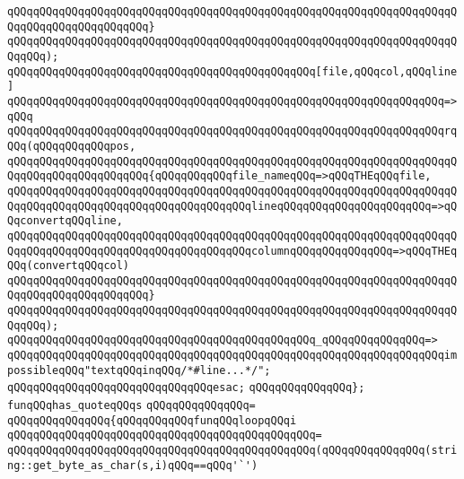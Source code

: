 \verb|qQQqqQQqqQQqqQQqqQQqqQQqqQQqqQQqqQQqqQQqqQQqqQQqqQQqqQQqqQQqqQQqqQQqqQQqqQQqqQQqqQQqqQQqqQQq}|\newline
\verb|qQQqqQQqqQQqqQQqqQQqqQQqqQQqqQQqqQQqqQQqqQQqqQQqqQQqqQQqqQQqqQQqqQQqqQQqqQQq);|\newline
\newline
\verb|qQQqqQQqqQQqqQQqqQQqqQQqqQQqqQQqqQQqqQQqqQQqqQQq[file,qQQqcol,qQQqline]|\newline
\verb|qQQqqQQqqQQqqQQqqQQqqQQqqQQqqQQqqQQqqQQqqQQqqQQqqQQqqQQqqQQqqQQqqQQq=>qQQq|\newline
\verb|qQQqqQQqqQQqqQQqqQQqqQQqqQQqqQQqqQQqqQQqqQQqqQQqqQQqqQQqqQQqqQQqqQQqrqQQq(qQQqqQQqqQQqpos,|\newline
\verb|qQQqqQQqqQQqqQQqqQQqqQQqqQQqqQQqqQQqqQQqqQQqqQQqqQQqqQQqqQQqqQQqqQQqqQQqqQQqqQQqqQQqqQQqqQQq{qQQqqQQqqQQqfile_nameqQQq=>qQQqTHEqQQqfile,|\newline
\verb|qQQqqQQqqQQqqQQqqQQqqQQqqQQqqQQqqQQqqQQqqQQqqQQqqQQqqQQqqQQqqQQqqQQqqQQqqQQqqQQqqQQqqQQqqQQqqQQqqQQqqQQqqQQqlineqQQqqQQqqQQqqQQqqQQqqQQq=>qQQqconvertqQQqline,|\newline
\verb|qQQqqQQqqQQqqQQqqQQqqQQqqQQqqQQqqQQqqQQqqQQqqQQqqQQqqQQqqQQqqQQqqQQqqQQqqQQqqQQqqQQqqQQqqQQqqQQqqQQqqQQqqQQqcolumnqQQqqQQqqQQqqQQq=>qQQqTHEqQQq(convertqQQqcol)|\newline
\verb|qQQqqQQqqQQqqQQqqQQqqQQqqQQqqQQqqQQqqQQqqQQqqQQqqQQqqQQqqQQqqQQqqQQqqQQqqQQqqQQqqQQqqQQqqQQq}|\newline
\verb|qQQqqQQqqQQqqQQqqQQqqQQqqQQqqQQqqQQqqQQqqQQqqQQqqQQqqQQqqQQqqQQqqQQqqQQqqQQq);|\newline
\newline
\verb|qQQqqQQqqQQqqQQqqQQqqQQqqQQqqQQqqQQqqQQqqQQqqQQq_qQQqqQQqqQQqqQQq=>|\newline
\verb|qQQqqQQqqQQqqQQqqQQqqQQqqQQqqQQqqQQqqQQqqQQqqQQqqQQqqQQqqQQqqQQqqQQqimpossibleqQQq"textqQQqinqQQq/*#line...*/";|\newline
\newline
\verb|qQQqqQQqqQQqqQQqqQQqqQQqqQQqqQQqesac;|\newline
\verb|qQQqqQQqqQQqqQQq};|\newline
\newline
\verb|funqQQqhas_quoteqQQqs|\newline
\verb|qQQqqQQqqQQqqQQq=|\newline
\verb|qQQqqQQqqQQqqQQq{qQQqqQQqqQQqfunqQQqloopqQQqi|\newline
\verb|qQQqqQQqqQQqqQQqqQQqqQQqqQQqqQQqqQQqqQQqqQQqqQQq=|\newline
\verb|qQQqqQQqqQQqqQQqqQQqqQQqqQQqqQQqqQQqqQQqqQQqqQQq(qQQqqQQqqQQqqQQq(string::get_byte_as_char(s,i)qQQq==qQQq'`')|\newline
